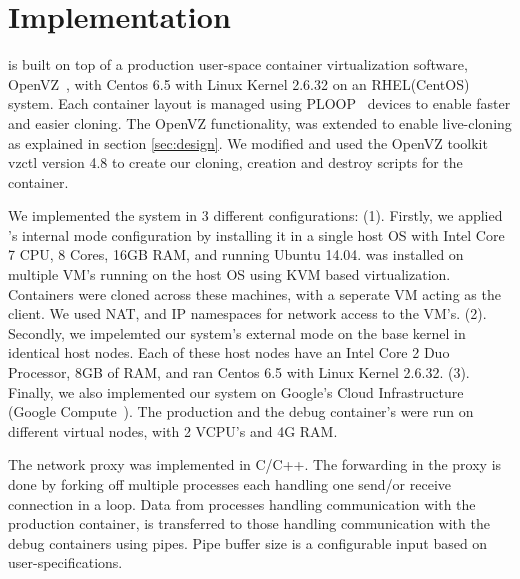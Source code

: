 
\section{Implementation}
\label{sec:implementation}

\parikshan is built on top of a production user-space container virtualization software, OpenVZ~\cite{openvz}, with Centos 6.5 with Linux Kernel 2.6.32 on an RHEL(CentOS) system.
Each container layout is managed using PLOOP~\cite{ploop} devices to enable faster and easier cloning.
The OpenVZ functionality, was extended to enable live-cloning as explained in section \ref{sec:design}.
We modified and used the OpenVZ toolkit vzctl version 4.8 to create our cloning, creation and destroy scripts for the container. 

We implemented the system in 3 different configurations: 
(1). Firstly, we applied \parikshan 's internal mode configuration by installing it in a single host OS with Intel Core 7 CPU, 8 Cores, 16GB RAM, and running Ubuntu 14.04. 
\parikshan was installed on multiple VM's running on the host OS using KVM based virtualization. 
Containers were cloned across these machines, with a seperate VM acting as the client.
We used NAT, and IP namespaces for network access to the VM's.
(2). Secondly, we impelemted our system's external mode on the base kernel in identical host nodes. 
Each of these host nodes have an Intel Core 2 Duo Processor, 8GB of RAM, and ran Centos 6.5 with Linux Kernel 2.6.32.
(3). Finally, we also implemented our system on Google's Cloud Infrastructure (Google Compute~\cite{gcompute}).
The production and the debug container's were run on different virtual nodes, with 2 VCPU's and 4G RAM. 

The network proxy was implemented in C/C++.
The forwarding in the proxy is done by forking off multiple processes each handling one send/or receive connection in a loop.
Data from processes handling communication with the production container, is  transferred to those handling communication with the debug containers using pipes.
Pipe buffer size is a configurable input based on user-specifications. 
